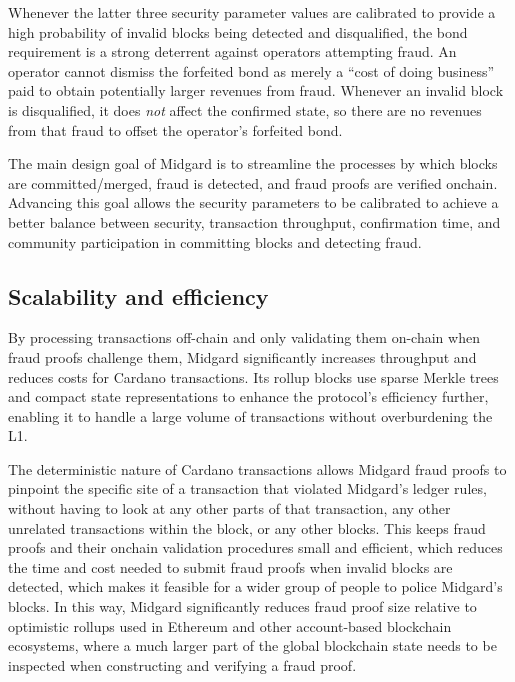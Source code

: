 \documentclass[../midgard.tex]{subfiles}
\begin{document}
Whenever the latter three security parameter values are calibrated to provide a high probability of invalid blocks being detected and disqualified, the bond requirement is a strong deterrent against operators attempting fraud.
An operator cannot dismiss the forfeited bond as merely a ``cost of doing business'' paid to obtain potentially larger revenues from fraud.
Whenever an invalid block is disqualified, it does \emph{not} affect the confirmed state, so there are no revenues from that fraud to offset the operator's forfeited bond.

The main design goal of Midgard is to streamline the processes by which blocks are committed/merged, fraud is detected, and fraud proofs are verified onchain.
Advancing this goal allows the security parameters to be calibrated to achieve a better balance between security, transaction throughput, confirmation time, and community participation in committing blocks and detecting fraud.

\subsection*{Scalability and efficiency}
\label{h:scalability-and-efficiency}

By processing transactions off-chain and only validating them on-chain when fraud proofs challenge them, Midgard significantly increases throughput and reduces costs for Cardano transactions.
Its rollup blocks use sparse Merkle trees and compact state representations to enhance the protocol's efficiency further, enabling it to handle a large volume of transactions without overburdening the L1.

The deterministic nature of Cardano transactions allows Midgard fraud proofs to pinpoint the specific site of a transaction that violated Midgard's ledger rules, without having to look at any other parts of that transaction, any other unrelated transactions within the block, or any other blocks.
This keeps fraud proofs and their onchain validation procedures small and efficient, which reduces the time and cost needed to submit fraud proofs when invalid blocks are detected, which makes it feasible for a wider group of people to police Midgard's blocks.
In this way, Midgard significantly reduces fraud proof size relative to optimistic rollups used in Ethereum and other account-based blockchain ecosystems, where a much larger part of the global blockchain state needs to be inspected when constructing and verifying a fraud proof.
\end{document}
